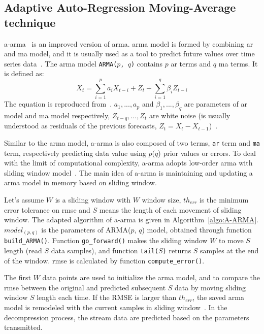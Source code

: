 \subsection{Adaptive Auto-Regression Moving-Average technique}


\acrfull{a-arma}~\cite{lu2010optimized} is an improved version of
\acrfull{arma}. \acrshort{arma} model is formed by combining \acrshort{ar} and
\acrshort{ma} model, and it is usually used as a tool to predict future values
over time series data~\cite{chatfield2016analysis}. The \acrshort{arma} model
\texttt{ARMA($p$, $q$)} contains $p$ \acrshort{ar} terms and $q$ \acrshort{ma}
terms. It is defined as:
\begin{equation}
X_t = \sum_{i=1}^{p}a_{i}X_{t-i} + Z_t + \sum_{i=1}^{q}\beta_{i}Z_{t-i}
\end{equation}
\noindent The equation is reproduced from~\cite{chatfield2016analysis}.
$a_1, ..., a_p$ and $\beta_1, ..., \beta_q$ are parameters of \acrshort{ar}
model and \acrshort{ma} model respectively, $Z_{t-q}, ...,Z_{t}$ are white noise
(is usually understood as residuals of the previous forecasts, $Z_t = X_t -
X_{t-1}$)~\cite{chatfield2016analysis}.

Similar to the \acrshort{arma} model, \acrshort{a-arma} is also composed of two
terms, \texttt{\acrshort{ar}} term and \texttt{\acrshort{ma}} term, respectively
predicting data value using $p$($q$) prior values or errors. To deal with the
limit of computational complexity, \acrshort{a-arma} adopts low-order
\acrshort{arma} with sliding window model~\cite{lu2010optimized}. The main idea
of \acrshort{a-arma} is maintaining and updating a \acrshort{arma} model in
memory based on sliding window.

Let's assume $W$ is a sliding window with $W$ window size, $th_{err}$ is the
minimum error tolerance on \acrfull{rmse} and $S$ means the length of each
movement of sliding window. The adapted algorithm of \acrshort{a-arma} is given
in Algorithm~\ref{algo:A-ARMA}. $model_{(p, q)}$ is the parameters of ARMA($p$,
$q$) model, obtained through function \texttt{build\_ARMA()}. Function
\texttt{go\_forward()} makes the sliding window $W$ to move $S$ length (read $S$
data samples), and function \texttt{tail($S$)} returns $S$ samples at the end of
the window. \acrshort{rmse} is calculated by function \texttt{compute\_error()}.

The first $W$ data points are used to initialize the \acrshort{arma} model, and
to compare the \acrshort{rmse} between the original and predicted subsequent $S$
data by moving sliding window $S$ length each time. If the RMSE is larger than
$th_{err}$, the saved \acrshort{arma} model is remodeled with the current
samples in sliding window~\cite{lu2010optimized}. In the decompression process,
the stream data are predicted based on the parameters transmitted.

